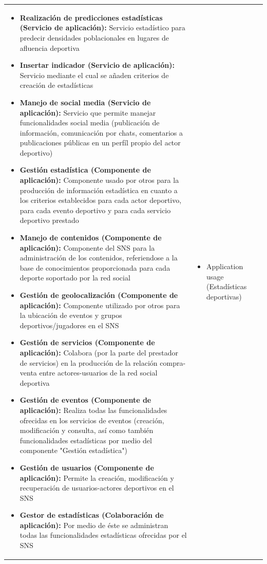 \begin{table}[!htb]
\begin{center}
{\begin{tabular}{|p{7cm}|p{4cm}|}
\begin{itemize}
				\item \textbf{Realización de predicciones estadísticas (Servicio de aplicación):} Servicio estadístico para predecir densidades poblacionales en lugares de afluencia deportiva
				\item \textbf{Insertar indicador (Servicio de aplicación):} Servicio mediante el cual se añaden criterios de creación de estadísticas
				\item \textbf{Manejo de social media (Servicio de aplicación):} Servicio que permite manejar funcionalidades social media (publicación de información, comunicación por chats, comentarios a publicaciones públicas en un perfíl propio del actor deportivo)
				\item \textbf{Gestión estadística (Componente de aplicación):} Componente usado por otros para la producción de información estadística en cuanto a los criterios establecidos para cada actor deportivo, para cada evento deportivo y para cada servicio deportivo prestado
				\item \textbf{Manejo de contenidos (Componente de aplicación):} Componente del SNS para la administración de los contenidos, referiendose a la base de conocimientos proporcionada para cada deporte soportado por la red social
				\item \textbf{Gestión de geolocalización (Componente de aplicación):} Componente utilizado por otros para la ubicación de eventos y grupos deportivos/jugadores en el SNS
				\item \textbf{Gestión de servicios (Componente de aplicación):} Colabora (por la parte del prestador de servicios) en la producción de la relación compra-venta entre actores-usuarios de la red social deportiva
				\item \textbf{Gestión de eventos (Componente de aplicación):} Realiza todas las funcionalidades ofrecidas en los servicios de eventos (creación, modificación y consulta, así como también funcionalidades estadísticas por medio del componente "Gestión estadística")
				\item \textbf{Gestión de usuarios (Componente de aplicación):} Permite la creación, modificación y recuperación de usuarios-actores deportivos en el SNS
				\item \textbf{Gestor de estadísticas (Colaboración de aplicación):} Por medio de éste se administran todas las funcionalidades estadísticas ofrecidas por el SNS 
			\end{itemize} 
			&
			\begin{itemize}
				\item Application usage (Estadísticas deportivas)

\end{itemize}
\end{tabular}}
\end{center}
\end{table}
